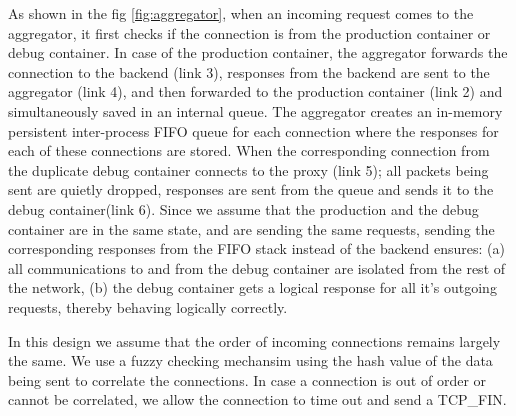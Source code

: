 As shown in the fig \ref{fig:aggregator}, when an incoming request comes to the aggregator, it first checks if the connection is from the production container or debug container. 
In case of the production container, the aggregator forwards the connection to the backend (link 3), responses from the backend are sent to the aggregator (link 4), and then forwarded to the production container (link 2) and simultaneously saved in an internal queue.
The aggregator creates an in-memory persistent inter-process FIFO queue for each connection where the responses for each of these connections are stored.
When the corresponding connection from the duplicate debug container connects to the proxy (link 5); all packets being sent are quietly dropped, responses are sent from the queue and sends it to the debug container(link 6).
Since we assume that the production and the debug container are in the same state, and are sending the same requests, sending the corresponding responses from the FIFO stack instead of the backend ensures: (a) all communications to and from the debug container are isolated from the rest of the network, (b) the debug container gets a logical response for all it's outgoing requests, thereby behaving logically correctly.

In this design we assume that the order of incoming connections remains largely the same.
We use a fuzzy checking mechansim using the hash value of the data being sent to correlate the connections. 
In case a connection is out of order or cannot be correlated, we allow the connection to time out and send a TCP\_FIN.

